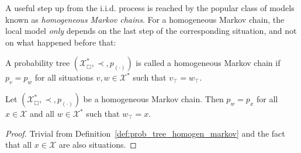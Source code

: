 \documentclass[graybox]{svmult}
\newcommand{\states}{\mathcal{X}}
\begin{document}
A useful step up from the i.i.d. process is reached by the popular class of models known as \emph{homogeneous Markov chains}. For a homogeneous Markov chain, the local model \emph{only} depends on the last step of the corresponding situation, and not on what happened before that:
\begin{definition}\label{def:prob_tree_homogen_markov}
A probability tree $(\states^*_\Box,\prec,p_{(\cdot)})$ is called a homogeneous Markov chain if $p_v=p_w$ for all situations $v,w\in\states^*$ such that $v_\top=w_\top$.
\end{definition} 
\begin{corollary}
Let $(\states^*_\Box,\prec,p_{(\cdot)})$ be a homogeneous Markov chain. Then $p_w=p_x$ for all $x\in\states$ and all $w\in\states^*$ such that $w_\top=x$.
\end{corollary}
\begin{proof}
Trivial from Definition~\ref{def:prob_tree_homogen_markov} and the fact that all $x\in\states$ are also situations. 
\end{proof}
\end{document}
